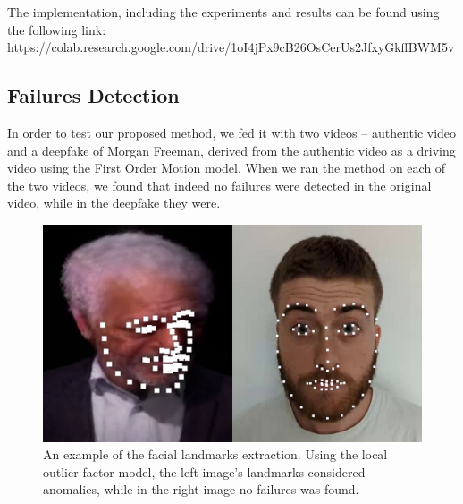 \documentclass[english,12pt]{article}
\begin{document}

The implementation, including the experiments and results can be found using the following link:\\
https://colab.research.google.com/drive/1oI4jPx9cB26OsCerUs2JfxyGkffBWM5v


\pagebreak{}

\subsection{Failures Detection}

In order to test our proposed method, we fed it with two videos -- authentic video and a deepfake of Morgan Freeman,
derived from the authentic video as a driving video using the First Order Motion model. When we ran the method on
each of the two videos, we found that indeed no failures were detected in the original video, while in the deepfake they were.

\begin{figure}[!htb]
  \begin{centering}
      \includegraphics[scale=0.6]{images/oren.png}
  \par\end{centering}
  \caption{\label{fig:Oren}An example of the facial landmarks extraction. Using the local outlier factor model, the left image's landmarks considered anomalies, while in the right image no failures was found.}
\end{figure}
\end{document}
